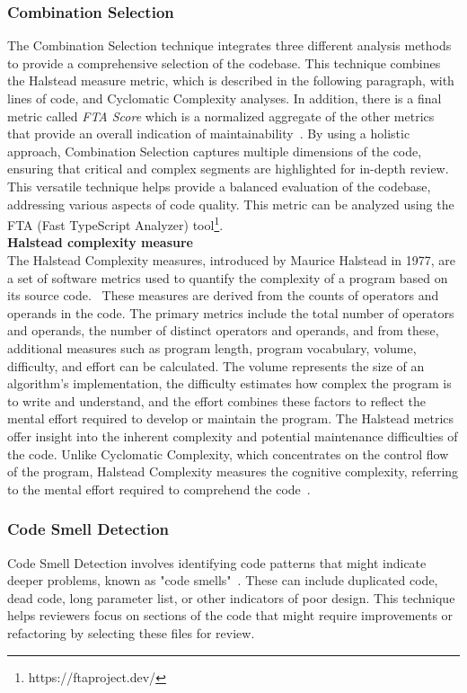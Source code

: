 \subsubsection{Combination Selection}
The Combination Selection technique integrates three different analysis methods to provide a comprehensive selection of the codebase. This technique combines the Halstead measure metric, which is described in the following paragraph, with lines of code, and Cyclomatic Complexity analyses. In addition, there is a final metric called \textit{FTA Score} which is a normalized aggregate of the other metrics that provide an overall indication of maintainability~\cite{FTA_2023}. By using a holistic approach, Combination Selection captures multiple dimensions of the code, ensuring that critical and complex segments are highlighted for in-depth review. This versatile technique helps provide a balanced evaluation of the codebase, addressing various aspects of code quality. This metric can be analyzed using the FTA (Fast TypeScript Analyzer) tool\footnote{https://ftaproject.dev/}.\\

\textbf{Halstead complexity measure} \label{halstead} \\
The Halstead Complexity measures, introduced by Maurice Halstead in 1977, are a set of software metrics used to quantify the complexity of a program based on its source code.~\cite{halstead} These measures are derived from the counts of operators and operands in the code. The primary metrics include the total number of operators and operands, the number of distinct operators and operands, and from these, additional measures such as program length, program vocabulary, volume, difficulty, and effort can be calculated. The volume represents the size of an algorithm's implementation, the difficulty estimates how complex the program is to write and understand, and the effort combines these factors to reflect the mental effort required to develop or maintain the program. The Halstead metrics offer insight into the inherent complexity and potential maintenance difficulties of the code. Unlike Cyclomatic Complexity, which concentrates on the control flow of the program, Halstead Complexity measures the cognitive complexity, referring to the mental effort required to comprehend the code~\cite{Software_Complexity_2021}. \\


\subsubsection{Code Smell Detection}
Code Smell Detection involves identifying code patterns that might indicate deeper problems, known as "code smells"~\cite{Code_Smells}. These can include duplicated code, dead code, long parameter list, or other indicators of poor design. This technique helps reviewers focus on sections of the code that might require improvements or refactoring by selecting these files for review. \\

